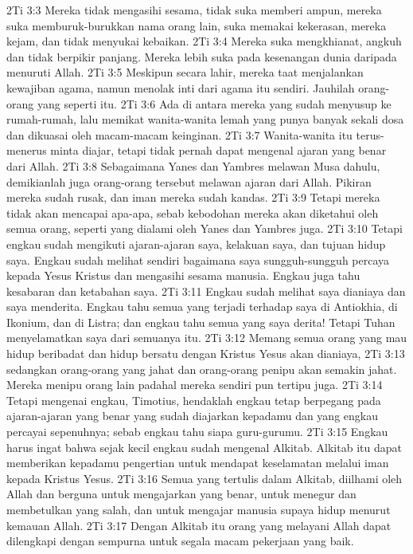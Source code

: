2Ti 3:3  Mereka tidak mengasihi sesama, tidak suka memberi ampun, mereka suka memburuk-burukkan nama orang lain, suka memakai kekerasan, mereka kejam, dan tidak menyukai kebaikan.
2Ti 3:4  Mereka suka mengkhianat, angkuh dan tidak berpikir panjang. Mereka lebih suka pada kesenangan dunia daripada menuruti Allah.
2Ti 3:5  Meskipun secara lahir, mereka taat menjalankan kewajiban agama, namun menolak inti dari agama itu sendiri. Jauhilah orang-orang yang seperti itu.
2Ti 3:6  Ada di antara mereka yang sudah menyusup ke rumah-rumah, lalu memikat wanita-wanita lemah yang punya banyak sekali dosa dan dikuasai oleh macam-macam keinginan.
2Ti 3:7  Wanita-wanita itu terus-menerus minta diajar, tetapi tidak pernah dapat mengenal ajaran yang benar dari Allah.
2Ti 3:8  Sebagaimana Yanes dan Yambres melawan Musa dahulu, demikianlah juga orang-orang tersebut melawan ajaran dari Allah. Pikiran mereka sudah rusak, dan iman mereka sudah kandas.
2Ti 3:9  Tetapi mereka tidak akan mencapai apa-apa, sebab kebodohan mereka akan diketahui oleh semua orang, seperti yang dialami oleh Yanes dan Yambres juga.
2Ti 3:10  Tetapi engkau sudah mengikuti ajaran-ajaran saya, kelakuan saya, dan tujuan hidup saya. Engkau sudah melihat sendiri bagaimana saya sungguh-sungguh percaya kepada Yesus Kristus dan mengasihi sesama manusia. Engkau juga tahu kesabaran dan ketabahan saya.
2Ti 3:11  Engkau sudah melihat saya dianiaya dan saya menderita. Engkau tahu semua yang terjadi terhadap saya di Antiokhia, di Ikonium, dan di Listra; dan engkau tahu semua yang saya derita! Tetapi Tuhan menyelamatkan saya dari semuanya itu.
2Ti 3:12  Memang semua orang yang mau hidup beribadat dan hidup bersatu dengan Kristus Yesus akan dianiaya,
2Ti 3:13  sedangkan orang-orang yang jahat dan orang-orang penipu akan semakin jahat. Mereka menipu orang lain padahal mereka sendiri pun tertipu juga.
2Ti 3:14  Tetapi mengenai engkau, Timotius, hendaklah engkau tetap berpegang pada ajaran-ajaran yang benar yang sudah diajarkan kepadamu dan yang engkau percayai sepenuhnya; sebab engkau tahu siapa guru-gurumu.
2Ti 3:15  Engkau harus ingat bahwa sejak kecil engkau sudah mengenal Alkitab. Alkitab itu dapat memberikan kepadamu pengertian untuk mendapat keselamatan melalui iman kepada Kristus Yesus.
2Ti 3:16  Semua yang tertulis dalam Alkitab, diilhami oleh Allah dan berguna untuk mengajarkan yang benar, untuk menegur dan membetulkan yang salah, dan untuk mengajar manusia supaya hidup menurut kemauan Allah.
2Ti 3:17  Dengan Alkitab itu orang yang melayani Allah dapat dilengkapi dengan sempurna untuk segala macam pekerjaan yang baik.
